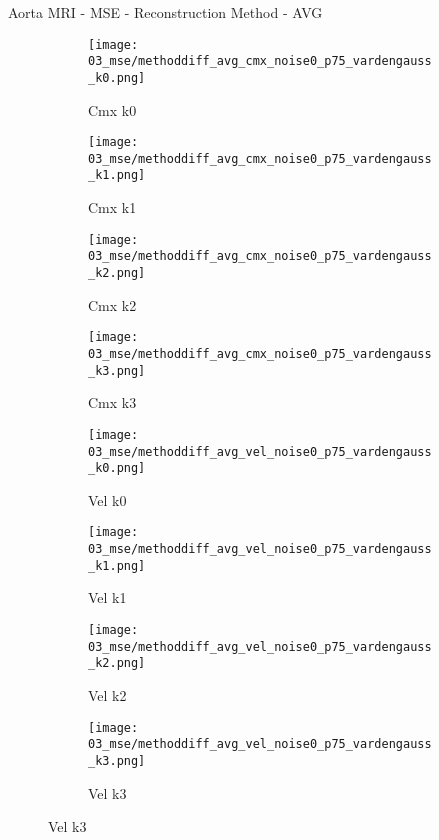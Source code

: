 \documentclass{beamer}
\begin{document}
\begin{frame}{Aorta MRI - MSE - Reconstruction Method - AVG}{}
\begin{figure}
\begin{subfigure}{0.24\textwidth}
\texttt{[image: 03\_mse/methoddiff\_avg\_cmx\_noise0\_p75\_vardengauss\_k0.png]}
\vspace{-20pt}
\caption*{\tiny Cmx k0}
\end{subfigure}
\begin{subfigure}{0.24\textwidth}
\texttt{[image: 03\_mse/methoddiff\_avg\_cmx\_noise0\_p75\_vardengauss\_k1.png]}
\vspace{-20pt}
\caption*{\tiny Cmx k1}
\end{subfigure}
\begin{subfigure}{0.24\textwidth}
\texttt{[image: 03\_mse/methoddiff\_avg\_cmx\_noise0\_p75\_vardengauss\_k2.png]}
\vspace{-20pt}
\caption*{\tiny Cmx k2}
\end{subfigure}
\begin{subfigure}{0.24\textwidth}
\texttt{[image: 03\_mse/methoddiff\_avg\_cmx\_noise0\_p75\_vardengauss\_k3.png]}
\vspace{-20pt}
\caption*{\tiny Cmx k3}
\end{subfigure}

\begin{subfigure}{0.24\textwidth}
\texttt{[image: 03\_mse/methoddiff\_avg\_vel\_noise0\_p75\_vardengauss\_k0.png]}
\vspace{-20pt}
\caption*{\tiny Vel k0}
\end{subfigure}
\begin{subfigure}{0.24\textwidth}
\texttt{[image: 03\_mse/methoddiff\_avg\_vel\_noise0\_p75\_vardengauss\_k1.png]}
\vspace{-20pt}
\caption*{\tiny Vel k1}
\end{subfigure}
\begin{subfigure}{0.24\textwidth}
\texttt{[image: 03\_mse/methoddiff\_avg\_vel\_noise0\_p75\_vardengauss\_k2.png]}
\vspace{-20pt}
\caption*{\tiny Vel k2}
\end{subfigure}
\begin{subfigure}{0.24\textwidth}
\texttt{[image: 03\_mse/methoddiff\_avg\_vel\_noise0\_p75\_vardengauss\_k3.png]}
\vspace{-20pt}
\caption*{\tiny Vel k3}
\end{subfigure}
\end{figure}
\end{frame}
\end{document}
